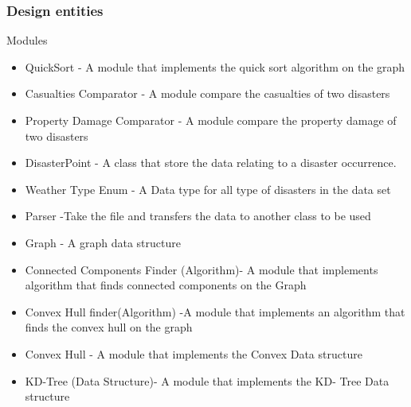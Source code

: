 \documentclass[12pt]{article}
\begin{document}
            \subsubsection{Design entities}
                 Modules 
                \begin{itemize}
                    \item QuickSort - A module that implements the quick sort algorithm on the graph 
                    \item Casualties Comparator - A module compare the casualties of two disasters 
                    \item Property Damage Comparator - A module compare the property damage of two disasters 
                    \item DisasterPoint - A class that store the data relating to a disaster occurrence. 
                    \item Weather Type Enum - A Data type for all type of disasters in the data set
                    \item Parser -Take the file and transfers the data to another class to be used 
                    \item Graph - A graph data structure 
                    \item Connected Components Finder (Algorithm)- A module that implements algorithm that finds connected components on the Graph
                    \item Convex Hull finder(Algorithm) -A module that implements an algorithm that finds the convex hull on the graph
                    \item Convex Hull - A module that implements the Convex Data structure 
                    \item KD-Tree (Data Structure)- A module that implements the KD- Tree Data structure 
                \end{itemize}
                
\end{document}
